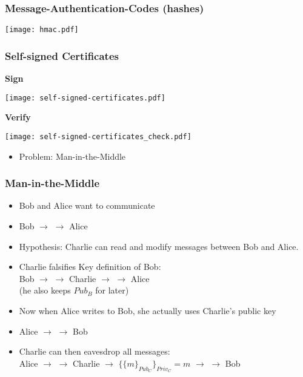 \documentclass[
hyperref={pdfpagelabels=false}
,xcolor=table
]
{beamer}
\begin{document}
\begin{frame}
  \frametitle{Message-Authentication-Codes (hashes)}

  \begin{center}
    \texttt{[image: hmac.pdf]}
  \end{center}
\end{frame}


\begin{frame}
  \frametitle{Self-signed Certificates}

  \begin{minipage}[t]{.45\linewidth}
    \textbf{Sign}
    
    \texttt{[image: self-signed-certificates.pdf]}        
  \end{minipage}
  \hfill
  \begin{minipage}[t]{.45\linewidth}
    \textbf{Verify}
    
    \texttt{[image: self-signed-certificates\_check.pdf]}    
  \end{minipage}

  \begin{itemize}
  \item Problem: Man-in-the-Middle
  \end{itemize}
  
\end{frame}

\begin{frame}
  \frametitle{Man-in-the-Middle}

  \begin{itemize}
  \item Bob and Alice want to communicate
  \item Bob $\longrightarrow$  $\longrightarrow$ Alice
  \item Hypothesis: Charlie can read and modify messages between Bob and Alice. 
  \item Charlie falsifies Key definition of Bob: \\
    Bob $\longrightarrow$  $\longrightarrow$ Charlie $\longrightarrow$  $\longrightarrow$ Alice\\
    (he also keeps $Pub_B$ for later)
  \item Now when Alice writes to Bob, she actually uses Charlie's public key
  \item Alice $\longrightarrow$  $\longrightarrow$ Bob
  \item Charlie can then eavesdrop all messages:\\
    Alice $\longrightarrow$  $\longrightarrow$ Charlie $\rightarrow$ $\{\{m\}_{Pub_C}\}_{Priv_C} = m$ $\longrightarrow$  $\longrightarrow$ Bob
  \end{itemize}
  
\end{frame}
\end{document}
